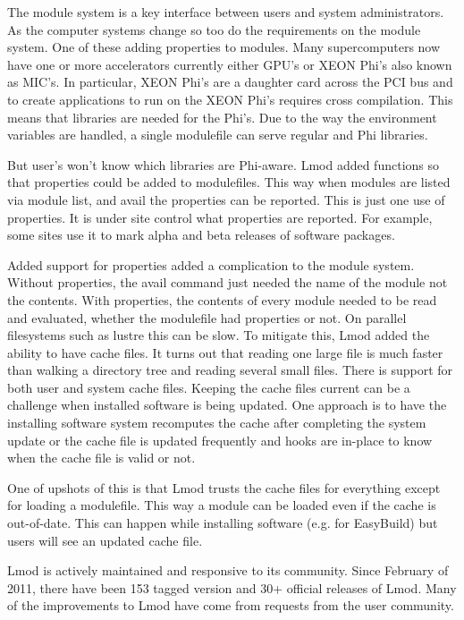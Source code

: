 The module system is a key interface between users and system
administrators.  
As the computer systems change so too do the requirements on the module
system.  One of these adding properties to modules.  Many
supercomputers now have one or more accelerators currently either GPU's
or XEON Phi's also known as MIC's.   In particular, XEON Phi's are a
daughter card across the PCI bus and to create applications to run on
the XEON Phi's requires cross compilation.  This means that libraries
are needed for the Phi's.  Due to the way the environment variables
are handled, a single modulefile can serve regular and Phi libraries.

But user's won't know which libraries are Phi-aware.  Lmod added
functions so that properties could be added to modulefiles.  This way
when modules are listed via module list, and avail the properties can
be reported.  This is just one use of properties.  It is under site
control what properties are reported.  For example, some sites use it
to mark alpha and beta releases of software packages.

Added support for properties added a complication to the module
system.  Without properties, the avail command just needed the name of
the module not the contents.  With properties, the contents of every
module needed to be read and evaluated, whether the modulefile had
properties or not. On parallel filesystems such as lustre this can be
slow.  To mitigate this, Lmod added the ability to have cache files.
It turns out that reading one large file is much faster than walking a
directory tree and reading several small files.  There is support for
both user and system cache files.  Keeping the cache files current can
be a challenge when installed software is being updated.  One approach
is to have the installing software system recomputes the cache after
completing the system update or the cache file is updated frequently
and hooks are in-place to know when the cache file is valid or not.

One of upshots of this is that Lmod trusts the cache files for
everything except for loading a modulefile.  This way a module can be
loaded even if the cache is out-of-date.  This can happen while
installing software (e.g. for EasyBuild) but users will see an updated
cache file.

Lmod is actively maintained and responsive to its community.  Since
February of 2011, there have been 153 tagged version and 30+ official
releases of Lmod.  Many of the improvements to Lmod have come from
requests from the user community.  

